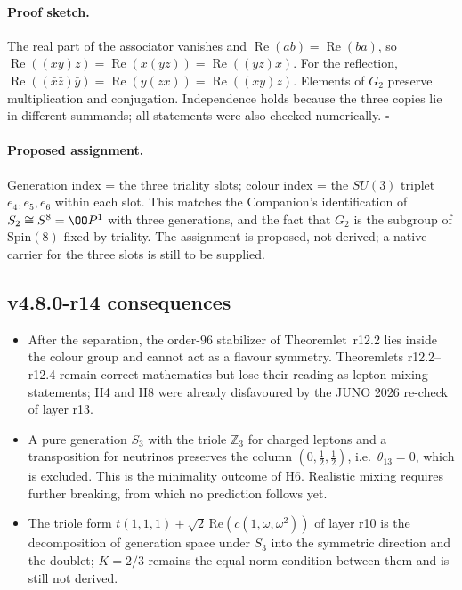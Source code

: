 \paragraph{Proof sketch.}
The real part of the associator vanishes and \(\operatorname{Re}(ab)=\operatorname{Re}(ba)\), so
\(\operatorname{Re}((xy)z)=\operatorname{Re}(x(yz))=\operatorname{Re}((yz)x)\).  For the reflection,
\(\operatorname{Re}((\bar x\bar z)\bar y)=\operatorname{Re}(y(zx))=\operatorname{Re}((xy)z)\).  Elements of
\(G_2\) preserve multiplication and conjugation.  Independence holds because the three copies lie in different
summands; all statements were also checked numerically.  \(\square\)

\paragraph{Proposed assignment.}
Generation index = the three triality slots; colour index = the \(SU(3)\) triplet \(e_4,e_5,e_6\) within each
slot.  This matches the Companion's identification of \(S_2\cong S^8=\OO P^1\) with three generations, and the
fact that \(G_2\) is the subgroup of \(\mathrm{Spin}(8)\) fixed by triality.  The assignment is proposed, not
derived; a native carrier for the three slots is still to be supplied.

\subsection*{v4.8.0-r14 consequences}
\label{subsec:v480-r14-consequences}

\begin{itemize}
\item After the separation, the order-\(96\) stabilizer of Theoremlet~r12.2 lies inside the colour group and
cannot act as a flavour symmetry.  Theoremlets r12.2--r12.4 remain correct mathematics but lose their reading
as lepton-mixing statements; H4 and H8 were already disfavoured by the JUNO 2026 re-check of layer r13.
\item A pure generation \(S_3\) with the triole \(\mathbb Z_3\) for charged leptons and a transposition for
neutrinos preserves the column \((0,\tfrac12,\tfrac12)\), i.e.\ \(\theta_{13}=0\), which is excluded.  This is
the minimality outcome of H6.  Realistic mixing requires further breaking, from which no prediction follows yet.
\item The triole form \(t(1,1,1)+\sqrt2\,\mathrm{Re}(c(1,\omega,\omega^2))\) of layer r10 is the decomposition of
generation space under \(S_3\) into the symmetric direction and the doublet; \(K=2/3\) remains the equal-norm
condition between them and is still not derived.
\end{itemize}

